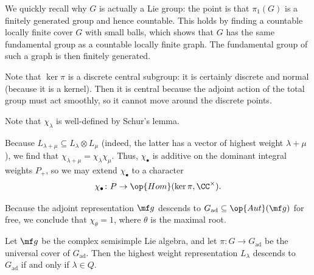 \documentclass[../notes.tex]{subfiles}
\begin{document}
\begin{remark} \label{rem:pi1-fg}
	We quickly recall why $G$ is actually a Lie group: the point is that $\pi_1(G)$ is a finitely generated group and hence countable. This holds by finding a countable locally finite cover $G$ with small balls, which shows that $G$ has the same fundamental group as a countable locally finite graph. The fundamental group of such a graph is then finitely generated.
\end{remark}
\begin{remark}
	Note that $\ker\pi$ is a discrete central subgroup: it is certainly discrete and normal (because it is a kernel). Then it is central because the adjoint action of the total group must act smoothly, so it cannot move around the discrete points.
\end{remark}
\begin{remark}
	Note that $\chi_\lambda$ is well-defined by Schur's lemma.
\end{remark}
\begin{remark}
	Because $L_{\lambda+\mu}\subseteq L_\lambda\otimes L_\mu$ (indeed, the latter has a vector of highest weight $\lambda+\mu$), we find that $\chi_{\lambda+\mu}=\chi_\lambda\chi_\mu$. Thus, $\chi_\bullet$ is additive on the dominant integral weights $P_+$, so we may extend $\chi_\bullet$ to a character
	\[\chi_\bullet\colon P\to\op{Hom}(\ker\pi,\CC^\times).\]
\end{remark}
\begin{remark}
	Because the adjoint representation $\mf g$ descends to $G_{\mathrm{ad}}\subseteq\op{Aut}(\mf g)$ for free, we conclude that $\chi_\theta=1$, where $\theta$ is the maximal root.
\end{remark}
\begin{proposition}
	Let $\mf g$ be the complex semisimple Lie algebra, and let $\pi\colon G\to G_{\mathrm{ad}}$ be the universal cover of $G_{\mathrm{ad}}$. Then the highest weight representation $L_\lambda$ descends to $G_{\mathrm{ad}}$ if and only if $\lambda\in Q$.
\end{proposition}
\end{document}
